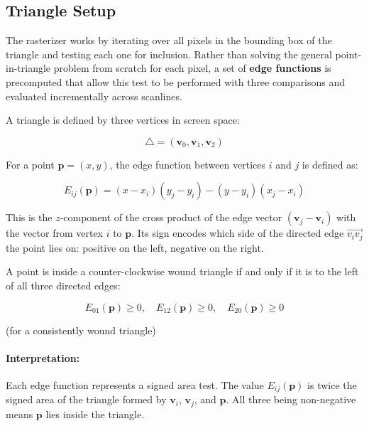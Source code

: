 \documentclass[11pt]{article}
\begin{document}
\subsection{Triangle Setup}

The rasterizer works by iterating over all pixels in the bounding box of the triangle and testing each one for inclusion. Rather than solving the general point-in-triangle problem from scratch for each pixel, a set of \textbf{edge functions} is precomputed that allow this test to be performed with three comparisons and evaluated incrementally across scanlines.

A triangle is defined by three vertices in screen space:

\begin{equation}
    \triangle = (\mathbf{v}_0, \mathbf{v}_1, \mathbf{v}_2)
\end{equation}

For a point $\mathbf{p} = (x, y)$, the edge function between vertices $i$ and $j$ is defined as:

\begin{equation}
    E_{ij}(\mathbf{p}) =
    (x - x_i)(y_j - y_i) - (y - y_i)(x_j - x_i)
\end{equation}

This is the $z$-component of the cross product of the edge vector $(\mathbf{v}_j - \mathbf{v}_i)$ with the vector from vertex $i$ to $\mathbf{p}$. Its sign encodes which side of the directed edge $\overrightarrow{v_i v_j}$ the point lies on: positive on the left, negative on the right.

A point is inside a counter-clockwise wound triangle if and only if it is to the left of all three directed edges:

\begin{equation}
    E_{01}(\mathbf{p}) \ge 0, \quad
    E_{12}(\mathbf{p}) \ge 0, \quad
    E_{20}(\mathbf{p}) \ge 0
\end{equation}

(for a consistently wound triangle)

\paragraph{Interpretation:}

Each edge function represents a signed area test. The value $E_{ij}(\mathbf{p})$ is twice the signed area of the triangle formed by $\mathbf{v}_i$, $\mathbf{v}_j$, and $\mathbf{p}$. All three being non-negative means $\mathbf{p}$ lies inside the triangle.
\end{document}
